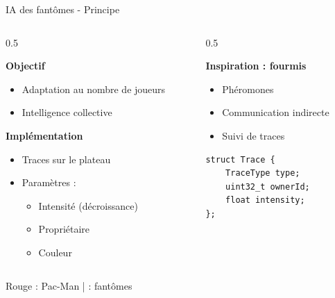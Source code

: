 \documentclass{beamer}
\begin{document}
\begin{frame}[fragile]{IA des fantômes - Principe}
\begin{columns}

\begin{column}{0.5\textwidth}

\textbf{Objectif}
\begin{itemize}
    \item Adaptation au nombre de joueurs
    \item Intelligence collective
\end{itemize}

\vspace{0.6cm}



\textbf{Implémentation}
\begin{itemize}
    \item Traces sur le plateau
    \item Paramètres :
    \begin{itemize}
        \item Intensité (décroissance)
        \item Propriétaire
        \item Couleur
    \end{itemize}
\end{itemize}

\end{column}

\begin{column}{0.5\textwidth}

\textbf{Inspiration : fourmis}
\begin{itemize}
    \item Phéromones
    \item Communication indirecte
    \item Suivi de traces
\end{itemize}

\vspace{0.9cm}

\begin{lstlisting}[basicstyle=\footnotesize]
struct Trace {
    TraceType type;
    uint32_t ownerId;
    float intensity;
};
\end{lstlisting}

\end{column}

\end{columns}
\vspace{0.5cm}
\begin{center}
    {\color{red}Rouge} : Pac-Man \quad |  : fantômes
\end{center}

\end{frame}
\end{document}
